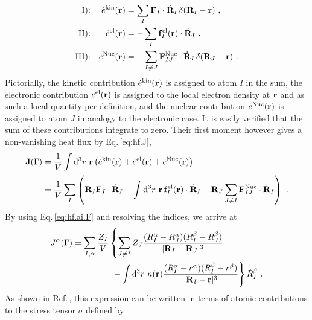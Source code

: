 \begin{subequations}
\begin{align}
	\text{I):}&&
		\dot{e}^{\rm kin} ({\bf r}) &= \sum_I {\bf F}_I \cdot \dot{{\bf R}}_I \, \delta ({\bf R}_I - {\bf r})~, \\
	\text{II):}&&
		\dot{e}^{\rm el} ({\bf r})  &= -\sum_{I} {\bf f}_I^{\rm el} ({\bf r}) \cdot \dot{{\bf R}}_I~, \\
	\text{III):}&&
		\dot{e}^{\rm Nuc} ({\bf r}) &= -\sum_{I \neq J} {\bf F}^{\rm Nuc}_{IJ} \cdot \dot{{\bf R}}_I \, \delta ({\bf R}_J - {\bf r})~.
\end{align}
\label{eq:hf.ai.densities}
\end{subequations}
Pictorially, the kinetic contribution $\dot{e}^{\rm kin} ({\bf r})$ is assigned to atom $I$ in the sum, the electronic contribution $\dot{e}^{\rm el} ({\bf r})$ is assigned to the local electron density at ${\bf r}$ and as such a local quantity per definition, and the nuclear contribution $\dot{e}^{\rm Nuc} ({\bf r})$ is assigned to atom $J$ in analogy to the electronic case. It is easily verified that the sum of these contributions integrate to zero. Their first moment however gives a non-vanishing heat flux by Eq.\,\eqref{eq:hf.J},
\begin{align}
	{\bf J} (\Gamma)
		&= \frac{1}{V} \int {\rm d}^3 r ~ {\bf r} \left( \dot{e}^{\rm kin} ({\bf r}) + \dot{e}^{\rm el} ({\bf r}) + \dot{e}^{\rm Nuc} ({\bf r})  \right) \\
		&= \frac{1}{V} \sum_I
			\left( 
				{\bf R}_I {\bf F}_I \cdot \dot{{\bf R}}_I
				- \int {\rm d}^3 r ~ {\bf r} \, {\bf f}_I^{\rm el} ({\bf r}) \cdot \dot{{\bf R}}_I
				- {\bf R}_J \sum_{J \neq I} {\bf F}^{\rm Nuc}_{IJ} \cdot \dot{{\bf R}}_I
			\right)~.
\end{align}
By using Eq.\,\eqref{eq:hf.ai.F} and resolving the indices, we arrive at
\begin{align}
\begin{split}
	J^\alpha (\Gamma) \nonumber
		=  \sum_{I, \alpha} \frac{Z_I}{V}
			&\left\{ 
				\sum_{J \neq I} Z_J \frac{(R_I^\alpha - R_J^\alpha) (R_I^\beta - R_J^\beta)}{\lvert {\bf R}_I - {\bf R}_J \rvert^3} \right. \\
				&~\left.- \int {\rm d}^3 r ~ n({\bf r}) \frac{(R_I^\alpha - r^\alpha) (R_I^\beta - r^\beta)}{\lvert {\bf R}_I - {\bf r} \vert^3}
			\right\}
			\dot{R}^\beta_I~.
\end{split}
\end{align}
As shown in Ref.\,\cite{Carbogno2016}, this expression can be written in terms of atomic contributions to the stress tensor $\sigma$ defined by
